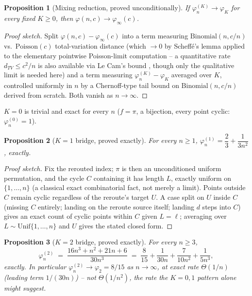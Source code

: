 \documentclass[11pt]{article}
\newtheorem{proposition}{Proposition}
\theoremstyle{remark}
\newcommand{\phiinf}{\varphi_\infty}
\newcommand{\Unif}{\mathrm{Unif}}
\begin{document}
\begin{proposition}[Mixing reduction, proved unconditionally]
\label{prop:mixing}
If $\varphi_n^{(K)}\to\varphi_K$ for every fixed $K\ge0$, then
$\varphi(n,c)\to\phiinf(c)$.
\end{proposition}

\begin{proof}[Proof sketch]
Split $\varphi(n,c)-\phiinf(c)$ into a term measuring
$\mathrm{Binomial}(n,c/n)$ vs.\ $\mathrm{Poisson}(c)$ total-variation
distance (which $\to0$ by Scheffé's lemma \cite{scheffe1947} applied to
the elementary pointwise Poisson-limit computation -- a quantitative
rate $d_{TV}\le c^2/n$ is also available via Le Cam's bound
\cite{lecam1960}, though only the qualitative limit is needed here) and
a term measuring $\varphi_n^{(K)}-\varphi_K$ averaged over $K$,
controlled uniformly in $n$ by a Chernoff-type tail bound on
$\mathrm{Binomial}(n,c/n)$ derived from scratch. Both vanish as
$n\to\infty$.
\end{proof}

$K=0$ is trivial and exact for every $n$ ($f=\pi$, a bijection, every
point cyclic: $\varphi_n^{(0)}=1$).

\begin{proposition}[$K=1$ bridge, proved exactly]
\label{prop:k1}
For every $n\ge1$, $\varphi_n^{(1)} = \dfrac23+\dfrac1{3n^2}$, exactly.
\end{proposition}

\begin{proof}[Proof sketch]
Fix the rerouted index; $\pi$ is then an unconditioned uniform
permutation, and the cycle $C$ containing it has length $L$, exactly
uniform on $\{1,\dots,n\}$ (a classical exact combinatorial fact, not
merely a limit). Points outside $C$ remain cyclic regardless of the
reroute's target $U$. A case split on $U$ inside $C$ (missing $C$
entirely; landing on the reroute source itself; landing $d$ steps into
$C$) gives an exact count of cyclic points within $C$ given $L=\ell$;
averaging over $L\sim\Unif\{1,\dots,n\}$ and $U$ gives the stated closed
form.
\end{proof}

\begin{proposition}[$K=2$ bridge, proved exactly]
\label{prop:k2}
For every $n\ge3$,
\[
  \varphi_n^{(2)} \;=\; \frac{16n^3+n^2+21n+6}{30n^3}
  \;=\; \frac{8}{15}+\frac1{30n}+\frac{7}{10n^2}+\frac1{5n^3},
\]
exactly. In particular $\varphi_n^{(2)}\to\varphi_2=8/15$ as $n\to\infty$,
at exact rate $\Theta(1/n)$ (leading term $1/(30n)$) -- \emph{not}
$\Theta(1/n^2)$, the rate the $K=0,1$ pattern alone might suggest.
\end{proposition}
\end{document}
